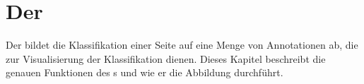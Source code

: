 \section{Der {\annotationService}}
    \label{section:solutionDetailsAnnotationService}
    Der {\annotationService} bildet die Klassifikation einer Seite
    auf eine Menge von Annotationen ab,
    die zur Visualisierung der Klassifikation dienen.
    Dieses Kapitel beschreibt die genauen Funktionen des {\annotationService}s
    und wie er die Abbildung durchführt.

    
    
    
